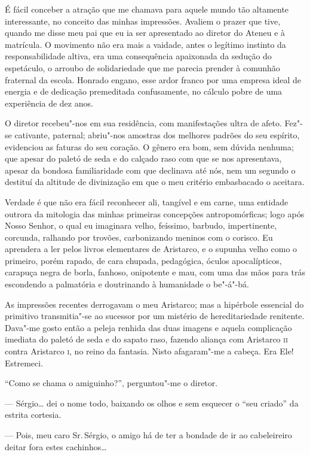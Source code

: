 É fácil conceber a atração que me chamava para aquele mundo
tão altamente interessante, no conceito das minhas impressões. Avaliem
o prazer que tive, quando me disse meu pai que eu ia ser apresentado ao
diretor do Ateneu e à matrícula. O movimento não era mais a vaidade,
antes o legítimo instinto da responsabilidade altiva, era uma
consequência apaixonada da sedução do espetáculo, o arroubo de
solidariedade que me parecia prender à comunhão fraternal da escola.
Honrado engano, esse ardor franco por uma empresa ideal de energia e de
dedicação premeditada confusamente, no cálculo pobre de uma experiência
de dez anos. 

O diretor recebeu"-nos em sua residência, com
manifestações ultra de afeto. Fez"-se cativante, paternal; abriu"-nos
amostras dos melhores padrões do seu espírito, evidenciou as faturas do
seu coração. O gênero era bom, sem dúvida nenhuma; que apesar do paletó
de seda e do calçado raso com que se nos apresentava, apesar da bondosa
familiaridade com que declinava até nós, nem um segundo o destituí da
altitude de divinização em que o meu critério embasbacado o aceitara.

Verdade é que não era fácil reconhecer ali, tangível e em carne, uma
entidade outrora da mitologia das minhas primeiras concepções
antropomórficas; logo após Nosso Senhor, o qual eu imaginara velho,
feíssimo, barbudo, impertinente, corcunda, ralhando por trovões,
carbonizando meninos com o corisco. Eu aprendera a ler pelos livros
elementares de Aristarco, e o supunha velho como o primeiro, porém
rapado, de cara chupada, pedagógica, óculos apocalípticos, carapuça
negra de borla, fanhoso, onipotente e mau, com uma das mãos para trás
escondendo a palmatória e doutrinando à humanidade o be"-á"-bá. 

As impressões recentes derrogavam o meu Aristarco; mas a hipérbole
essencial do primitivo transmitia"-se ao sucessor por um mistério de
hereditariedade renitente. Dava"-me gosto então a peleja renhida das
duas imagens e aquela complicação imediata do paletó de seda e do
sapato raso, fazendo aliança com Aristarco \textsc{ii} contra Aristarco \textsc{i}, no
reino da fantasia. Nisto afagaram"-me a cabeça. Era Ele! Estremeci.

``Como se chama o amiguinho?'', perguntou"-me o diretor. 

--- Sérgio\ldots{} dei o nome todo, baixando os olhos e sem esquecer o ``seu criado'' da
estrita cortesia. 

--- Pois, meu caro Sr.\,Sérgio, o amigo há de ter a
bondade de ir ao cabeleireiro deitar fora estes cachinhos\ldots{} 

